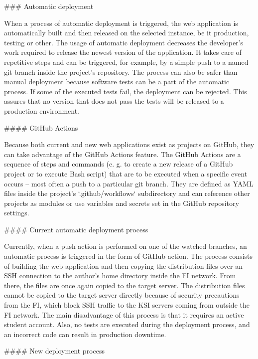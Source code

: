\documentclass[
  digital, %
  oneside, %
  lof,     %
  nolot,     %
]{fithesis4}
\begin{document}
{### Automatic deployment
\label{chap:autodeploy}

When a process of automatic deployment is triggered, the web application is automatically built and then released on the selected instance, be it production, testing or other. The usage of automatic deployment decreases the developer's work required to release the newest version of the application. It takes care of repetitive steps and can be triggered, for example, by a simple push to a named git branch inside the project's repository. The process can also be safer than manual deployment because software tests can be a part of the automatic process. If some of the executed tests fail, the deployment can be rejected. This assures that no version that does not pass the tests will be released to a production environment.

#### GitHub Actions

Because both current and new web applications exist as projects on GitHub, they can take advantage of the GitHub Actions feature. The GitHub Actions are a sequence of steps and commands (e. g. to create a new release of a GitHub project or to execute Bash script) that are to be executed when a specific event occurs -- most often a push to a particular git branch. They are defined as \acrshort{YAML} files inside the project's `.github/workflows` subdirectory and can reference other projects as modules or use variables and secrets set in the GitHub repository settings.

#### Current automatic deployment process

Currently, when a push action is performed on one of the watched branches, an automatic process is triggered in the form of GitHub action. The process consists of building the web application and then copying the distribution files over an \acrshort{SSH} connection to the author's home directory inside the \acrshort{FI} network. From there, the files are once again copied to the target server. The distribution files cannot be copied to the target server directly because of security precautions from the \acrshort{FI}, which block \acrshort{SSH} traffic to the \acrshort{KSI} servers coming from outside the \acrshort{FI} network. The main disadvantage of this process is that it requires an active student account. Also, no tests are executed during the deployment process, and an incorrect code can result in production downtime.

#### New deployment process

}
\end{document}
